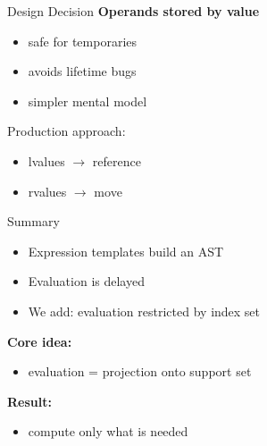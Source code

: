 \documentclass{beamer}
\begin{document}

\begin{frame}{Design Decision}
\textbf{Operands stored by value}

\vspace{1em}

\begin{itemize}
\item safe for temporaries
\item avoids lifetime bugs
\item simpler mental model
\end{itemize}

\vspace{1em}

Production approach:

\begin{itemize}
\item lvalues $\rightarrow$ reference
\item rvalues $\rightarrow$ move
\end{itemize}

\end{frame}


\begin{frame}{Summary}
\begin{itemize}
\item Expression templates build an AST
\item Evaluation is delayed
\item We add: evaluation restricted by index set
\end{itemize}

\vspace{1em}

\textbf{Core idea:}

\begin{itemize}
\item evaluation = projection onto support set
\end{itemize}

\vspace{1em}

\textbf{Result:}

\begin{itemize}
\item compute only what is needed
\end{itemize}

\end{frame}
\end{document}
